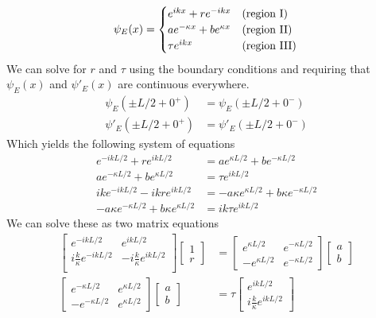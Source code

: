 \documentclass[]{book}
\begin{document}
\begin{equation}
\psi_E(x) =
\begin{cases}
e^{ikx}+re^{-ikx} & \textrm{(region I)} \\
ae^{-\kappa x} + be^{\kappa x} & \textrm{(region II)} \\
\tau e^{ikx} & \textrm{(region III)}
\end{cases} \\
\end{equation}
We can solve for $r$ and $\tau$ using the boundary conditions and requiring that $\psi_E(x)$ and $\psi'_E(x)$ are continuous everywhere.
\begin{equation}
\begin{split}
\psi_E(\pm L/2 + 0^+) &= \psi_E(\pm L/2 + 0^-) \\
\psi'_E(\pm L/2 + 0^+) &= \psi'_E(\pm L/2 + 0^-) 
\end{split}
\end{equation}
Which yields the following system of equations
\begin{equation}
\begin{split}
e^{-ikL/2} + re^{ikL/2} &= ae^{\kappa L/2}+be^{-\kappa L/2} \\
ae^{-\kappa L/2} + be^{\kappa L/2} &= \tau e^{ikL/2} \\
ike^{-ikL/2} - ikre^{ikL/2} &= -a\kappa e^{\kappa L/2}+b\kappa e^{-\kappa L/2} \\
-a\kappa e^{-\kappa L/2} + b\kappa e^{\kappa L/2} &= ik\tau e^{ikL/2}
\end{split}
\end{equation}
We can solve these as two matrix equations
\begin{equation}
\begin{split}
\begin{bmatrix}
e^{-ikL/2} & e^{ikL/2} \\
i\frac{k}{\kappa}e^{-ikL/2} & -i\frac{k}{\kappa}e^{ikL/2} \\
\end{bmatrix}
\begin{bmatrix}
1\\
r
\end{bmatrix}
& = 
\begin{bmatrix}
e^{\kappa L/2} & e^{-\kappa L/2} \\
-e^{\kappa L/2} & e^{-\kappa L/2}
\end{bmatrix}
\begin{bmatrix}
a \\
b
\end{bmatrix} \\
\begin{bmatrix}
e^{-\kappa L/2} & e^{\kappa L/2} \\
-e^{-\kappa L/2} & e^{\kappa L/2}
\end{bmatrix}
\begin{bmatrix}
a \\
b
\end{bmatrix}
&=
\tau\begin{bmatrix}
e^{ikL/2} \\
i\frac{k}{\kappa}e^{ikL/2}
\end{bmatrix}
\end{split}
\end{equation}
\end{document}
